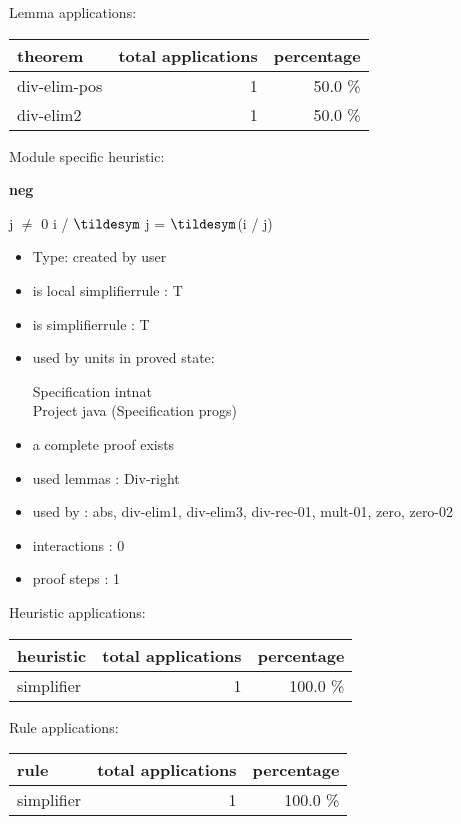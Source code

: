 \documentclass[a4paper]{article}
\begin{document}
Lemma applications:

\begin{supertabular}{l|r|r}
theorem	        & total applications & percentage \\ \hline
div-elim-pos & 1 & 50.0 \% \\
div-elim2 & 1 & 50.0 \% \\

\end{supertabular}

Module specific heuristic:

\pagebreak

{\LARGE\bf neg}\label{lemma-neg}

\medskip

j $\neq$ 0 \Fol i / $\tildesym$ j = $\tildesym$(i / j)

\begin{itemize}

\item Type: created by user

\item is local simplifierrule : T
\item is simplifierrule : T
\item used by units in proved state:

Specification intnat \\
Project java (Specification progs)
\item       a complete proof exists
\item       used lemmas  : Div-right
\item       used by      : abs, div-elim1, div-elim3, div-rec-01, mult-01, zero, zero-02
\item       interactions : 0
\item       proof steps  : 1
\end{itemize}

\medskip


Heuristic applications:

\begin{supertabular}{l|r|r}
heuristic	& total applications & percentage \\ \hline
simplifier & 1 & 100.0 \% \\

\end{supertabular}

Rule applications:

\begin{supertabular}{l|r|r}
rule	        & total applications & percentage \\ \hline
simplifier & 1 & 100.0 \% \\

\end{supertabular}
\end{document}
